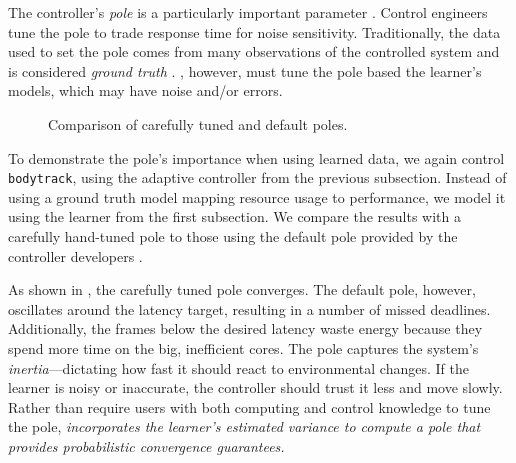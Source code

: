 The controller's \emph{pole} is a particularly important parameter
\cite{HandbookControl}.  Control engineers tune the pole to trade
response time for noise sensitivity.  Traditionally, the data used to
set the pole comes from many observations of the controlled system and
is considered \emph{ground truth} \cite{Hellerstein2004a,sysid}.
\SYSTEM{}, however, must tune the pole based the learner's models,
which may have noise and/or errors.


\begin{figure} 

\caption{Comparison of carefully tuned and default poles.}
\label{fig:not-simple}
\end{figure}
To demonstrate the pole's importance when using learned data, we again
control \texttt{bodytrack}, using the adaptive controller from the
previous subsection. Instead of using a ground truth model mapping
resource usage to performance, we model it using the learner from the
first subsection.  We compare the results with a carefully hand-tuned
pole to those using the default pole provided by the controller
developers \cite{POET}.

As shown in , the carefully tuned pole
converges. The default pole, however, oscillates around the
latency target, resulting in a number of missed deadlines.
Additionally, the frames below the desired latency waste
energy because they spend more time on the big, inefficient cores. The
pole captures the system's \emph{inertia}---dictating how fast it
should react to environmental changes.  If the learner is noisy or
inaccurate, the controller should trust it less and move slowly.
Rather than require users with both computing and control knowledge to
tune the pole, \emph{\SYSTEM{} incorporates the learner's estimated
  variance to compute a pole that provides probabilistic convergence
  guarantees.}


